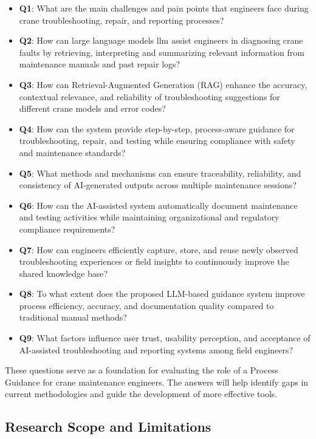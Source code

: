 \begin{itemize}
  \item \textbf{Q1\label{Q1}}: What are the main challenges and pain points that engineers face during crane troubleshooting, repair, and reporting processes?
  \item \textbf{Q2\label{Q2}}: How can large language models \acrshort{llm} assist engineers in diagnosing crane faults by retrieving, interpreting and summarizing relevant information from maintenance manuals and past repair logs?
  \item \textbf{Q3\label{Q3}}: How can Retrieval-Augmented Generation (RAG) enhance the accuracy, contextual relevance, and reliability of troubleshooting suggestions for different crane models and error codes?
  \item \textbf{Q4\label{Q4}}: How can the system provide step-by-step, process-aware guidance for troubleshooting, repair, and testing while ensuring compliance with safety and maintenance standards?
  \item \textbf{Q5\label{Q5}}: What methods and mechanisms can ensure traceability, reliability, and consistency of AI-generated outputs across multiple maintenance sessions?
  \item \textbf{Q6\label{Q6}}: How can the AI-assisted system automatically document maintenance and testing activities while maintaining organizational and regulatory compliance requirements?
  \item \textbf{Q7\label{Q7}}: How can engineers efficiently capture, store, and reuse newly observed troubleshooting experiences or field insights to continuously improve the shared knowledge base?
  \item \textbf{Q8\label{Q8}}: To what extent does the proposed LLM-based guidance system improve process efficiency, accuracy, and documentation quality compared to traditional manual methods?
  \item \textbf{Q9\label{Q9}}: What factors influence user trust, usability perception, and acceptance of AI-assisted troubleshooting and reporting systems among field engineers?
  
 \end{itemize}
These questions serve as a foundation for evaluating the role of a Process Guidance for crane maintenance engineers. The answers will help identify gaps in current methodologies and guide the development of more effective tools.


\subsection{Research Scope and Limitations}

